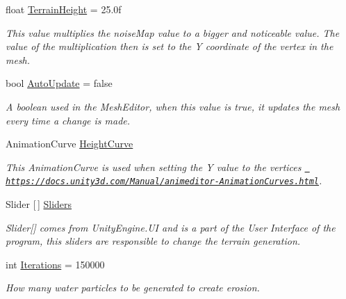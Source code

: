 \begin{DoxyCompactItemize}
float \mbox{\hyperlink{class_assets_1_1_scripts_1_1_mesh_generation_a20721d365a32b079f8731c4a60452265}{Terrain\+Height}} = 25.\+0f
\begin{DoxyCompactList}\small\item\em This value multiplies the noise\+Map value to a bigger and noticeable value. The value of the multiplication then is set to the Y coordinate of the vertex in the mesh. \end{DoxyCompactList}\item 
\mbox{\label{class_assets_1_1_scripts_1_1_mesh_generation_ac6facd09cd95702c8bb30274eca86887}} 
bool \mbox{\hyperlink{class_assets_1_1_scripts_1_1_mesh_generation_ac6facd09cd95702c8bb30274eca86887}{Auto\+Update}} = false
\begin{DoxyCompactList}\small\item\em A boolean used in the Mesh\+Editor, when this value is true, it updates the mesh every time a change is made. \end{DoxyCompactList}\item 
\mbox{\label{class_assets_1_1_scripts_1_1_mesh_generation_a3ee5573ae0fc97b319d40c3944cda198}} 
Animation\+Curve \mbox{\hyperlink{class_assets_1_1_scripts_1_1_mesh_generation_a3ee5573ae0fc97b319d40c3944cda198}{Height\+Curve}}
\begin{DoxyCompactList}\small\item\em This Animation\+Curve is used when setting the Y value to the vertices \href{https://docs.unity3d.com/Manual/animeditor-AnimationCurves.html}{\texttt{ https\+://docs.\+unity3d.\+com/\+Manual/animeditor-\/\+Animation\+Curves.\+html}}. \end{DoxyCompactList}\item 
\mbox{\label{class_assets_1_1_scripts_1_1_mesh_generation_a1c24986338908bad83bb97cfe269c334}} 
Slider \mbox{[}$\,$\mbox{]} \mbox{\hyperlink{class_assets_1_1_scripts_1_1_mesh_generation_a1c24986338908bad83bb97cfe269c334}{Sliders}}
\begin{DoxyCompactList}\small\item\em Slider\mbox{[}\mbox{]} comes from Unity\+Engine.\+UI and is a part of the User Interface of the program, this sliders are responsible to change the terrain generation. \end{DoxyCompactList}\item 
\mbox{\label{class_assets_1_1_scripts_1_1_mesh_generation_ad9d97bc7125a92c446af48aaae656cdd}} 
int \mbox{\hyperlink{class_assets_1_1_scripts_1_1_mesh_generation_ad9d97bc7125a92c446af48aaae656cdd}{Iterations}} = 150000
\begin{DoxyCompactList}\small\item\em How many water particles to be generated to create erosion. \end{DoxyCompactList}\end{DoxyCompactItemize}
